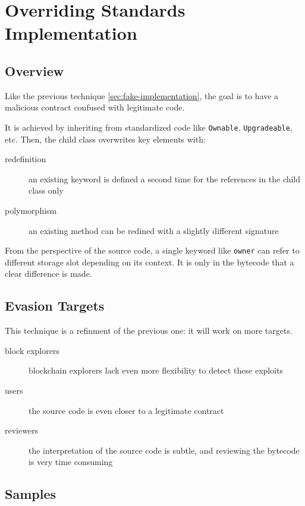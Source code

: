 \section{Overriding Standards Implementation} \label{sec:overriding-implementation}

\subsection{Overview}

Like the previous technique \ref{sec:fake-implementation}, the goal is to have a malicious contract confused with legitimate code.

It is achieved by inheriting from standardized code like \lstinline{Ownable}, \lstinline{Upgradeable}, etc.
Then, the child class overwrites key elements with:

\begin{description}
\item[redefinition]{an existing keyword is defined a second time for the references in the child class only}
\item[polymorphism]{an existing method can be redined with a slightly different signature}
\end{description}

From the perspective of the source code, a single keyword like \lstinline{owner} can refer to different storage slot depending on its context.
It is only in the bytecode that a clear difference is made.

\subsection{Evasion Targets}

This technique is a refinment of the previous one: it will work on more targets.

\begin{description}
\item[block explorers]{blockchain explorers lack even more flexibility to detect these exploits}
\item[users]{the source code is even closer to a legitimate contract}
\item[reviewers]{the interpretation of the source code is subtle, and reviewing the bytecode is very time consuming}
\end{description}

\subsection{Samples}

